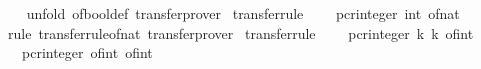 \begin{isabellebody}
%
\isadelimproof
\ \ %
\endisadelimproof
%
\isatagproof
{}\isamarkupfalse%
\ {\isacharparenleft}{\kern0pt}unfold\ of{\isacharunderscore}{\kern0pt}bool{\isacharunderscore}{\kern0pt}def{\isacharparenright}{\kern0pt}\ transfer{\isacharunderscore}{\kern0pt}prover%
\endisatagproof
{\isafoldproof}%
%
\isadelimproof
\isanewline
%
\endisadelimproof
\isanewline
{}\isamarkupfalse%
\ {\isacharbrackleft}{\kern0pt}transfer{\isacharunderscore}{\kern0pt}rule{\isacharbrackright}{\kern0pt}{\isacharcolon}{\kern0pt}\isanewline
\ \ {\isachardoublequoteopen}{\isacharparenleft}{\kern0pt}{\isacharparenleft}{\kern0pt}{\isacharequal}{\kern0pt}{\isacharparenright}{\kern0pt}\ {\isacharequal}{\kern0pt}{\isacharequal}{\kern0pt}{\isacharequal}{\kern0pt}{\isachargreater}{\kern0pt}\ pcr{\isacharunderscore}{\kern0pt}integer{\isacharparenright}{\kern0pt}\ int\ of{\isacharunderscore}{\kern0pt}nat{\isachardoublequoteclose}\isanewline
%
\isadelimproof
\ \ %
\endisadelimproof
%
\isatagproof
{}\isamarkupfalse%
\ {\isacharparenleft}{\kern0pt}rule\ transfer{\isacharunderscore}{\kern0pt}rule{\isacharunderscore}{\kern0pt}of{\isacharunderscore}{\kern0pt}nat{\isacharparenright}{\kern0pt}\ transfer{\isacharunderscore}{\kern0pt}prover{\isacharplus}{\kern0pt}%
\endisatagproof
{\isafoldproof}%
%
\isadelimproof
\isanewline
%
\endisadelimproof
\isanewline
{}\isamarkupfalse%
\ {\isacharbrackleft}{\kern0pt}transfer{\isacharunderscore}{\kern0pt}rule{\isacharbrackright}{\kern0pt}{\isacharcolon}{\kern0pt}\isanewline
\ \ {\isachardoublequoteopen}{\isacharparenleft}{\kern0pt}{\isacharparenleft}{\kern0pt}{\isacharequal}{\kern0pt}{\isacharparenright}{\kern0pt}\ {\isacharequal}{\kern0pt}{\isacharequal}{\kern0pt}{\isacharequal}{\kern0pt}{\isachargreater}{\kern0pt}\ pcr{\isacharunderscore}{\kern0pt}integer{\isacharparenright}{\kern0pt}\ {\isacharparenleft}{\kern0pt}{\isasymlambda}k{\isachardot}{\kern0pt}\ k{\isacharparenright}{\kern0pt}\ of{\isacharunderscore}{\kern0pt}int{\isachardoublequoteclose}\isanewline
%
\isadelimproof
%
\endisadelimproof
%
\isatagproof
{}\isamarkupfalse%
\ {\isacharminus}{\kern0pt}\isanewline
\ \ \isamarkupfalse%
\ {\isachardoublequoteopen}{\isacharparenleft}{\kern0pt}{\isacharparenleft}{\kern0pt}{\isacharequal}{\kern0pt}{\isacharparenright}{\kern0pt}\ {\isacharequal}{\kern0pt}{\isacharequal}{\kern0pt}{\isacharequal}{\kern0pt}{\isachargreater}{\kern0pt}\ pcr{\isacharunderscore}{\kern0pt}integer{\isacharparenright}{\kern0pt}\ of{\isacharunderscore}{\kern0pt}int\ of{\isacharunderscore}{\kern0pt}int{\isachardoublequoteclose}\isanewline

\end{isabellebody}
